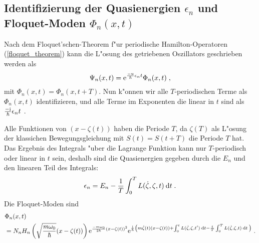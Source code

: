     \subsection{\texorpdfstring{Identifizierung der Quasienergien $\epsilon_n$ und Floquet-Moden $\Phi_n(x,t)$}{Identifizierung der Quasienergien \epsilon_n und Floquet-Moden \Phi_n(x,t)}}
      Nach dem Floquet'schen-Theorem f"ur periodische Hamilton-Operatoren (\ref{floquet_theorem}) kann die L"osung des getriebenen Oszillators geschrieben werden als
      \begin{equation}
        \Psi_n(x,t) = \text e^{\frac{-\text u}{\hbar}\epsilon_nt}\Phi_n(x,t) \; ,
      \end{equation}
      mit $\Phi_n(x,t)=\Phi_n(x,t+T)$.
      Nun k"onnen wir alle $T$-periodischen Terme als $\Phi_n(x,t)$ identifizieren, und alle Terme im Exponenten die linear in $t$ sind als $\frac{-\text i}{\hbar}\epsilon_n t$ \cite{haenggi}.

      Alle Funktionen von $(x-\zeta(t))$ haben die Periode $T$, da $\zeta(T)$ als L"osung der klassichen Bewegungsgleichung mit $S(t)=S(t+T)$ die Periode $T$ hat.
      Das Ergebnis des Integrals "uber die Lagrange Funktion kann nur $T$-periodisch oder linear in $t$ sein, deshalb sind die Quasienergien gegeben durch die $E_n$ und den linearen Teil des Integrals:
      \begin{equation}
        \epsilon_n = E_n - \frac{1}{T} \int_0^T L(\dot \zeta, \zeta, t) \: \text d t \; .
      \end{equation}
      Die Floquet-Moden sind
      \begin{align}
        \begin{split}
          &\Phi_n(x,t) \\
          &= N_nH_n\left(\sqrt{\frac{m\omega_0}{\hbar}}(x-\zeta(t))\right) \text e^{\frac{-m\omega_0}{2\hbar}(x-\zeta(t))^2} \text e^{\frac{\text i}{\hbar}\left(m\dot \zeta(t)(x-\zeta(t))+\int_0^tL(\dot \zeta,\zeta,t')\:\text d t-\frac{t}{T} \int_0^T L(\dot \zeta,\zeta,t)\:\text dt\: \right)} \; .
        \end{split}
      \end{align}


